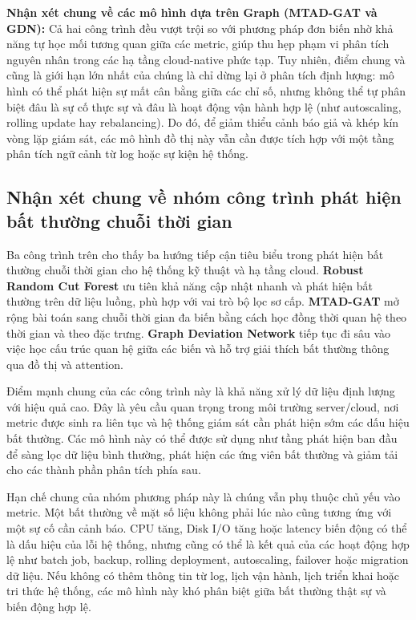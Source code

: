 \textbf{Nhận xét chung về các mô hình dựa trên Graph (MTAD-GAT và GDN):} 
Cả hai công trình đều vượt trội so với phương pháp đơn biến nhờ khả năng tự học mối tương quan giữa các metric, giúp thu hẹp phạm vi phân tích nguyên nhân trong các hạ tầng cloud-native phức tạp. Tuy nhiên, điểm chung và cũng là giới hạn lớn nhất của chúng là chỉ dừng lại ở phân tích định lượng: mô hình có thể phát hiện sự mất cân bằng giữa các chỉ số, nhưng không thể tự phân biệt đâu là sự cố thực sự và đâu là hoạt động vận hành hợp lệ (như autoscaling, rolling update hay rebalancing). Do đó, để giảm thiểu cảnh báo giả và khép kín vòng lặp giám sát, các mô hình đồ thị này vẫn cần được tích hợp với một tầng phân tích ngữ cảnh từ log hoặc sự kiện hệ thống.

\subsection*{Nhận xét chung về nhóm công trình phát hiện bất thường chuỗi thời gian}

Ba công trình trên cho thấy ba hướng tiếp cận tiêu biểu trong phát hiện bất thường chuỗi thời gian cho hệ thống kỹ thuật và hạ tầng cloud.\textbf{ Robust Random Cut Forest} ưu tiên khả năng cập nhật nhanh và phát hiện bất thường trên dữ liệu luồng, phù hợp với vai trò bộ lọc sơ cấp. \textbf{MTAD-GAT} mở rộng bài toán sang chuỗi thời gian đa biến bằng cách học đồng thời quan hệ theo thời gian và theo đặc trưng. \textbf{Graph Deviation Network} tiếp tục đi sâu vào việc học cấu trúc quan hệ giữa các biến và hỗ trợ giải thích bất thường thông qua đồ thị và attention.

Điểm mạnh chung của các công trình này là khả năng xử lý dữ liệu định lượng với hiệu quả cao. Đây là yêu cầu quan trọng trong môi trường server/cloud, nơi metric được sinh ra liên tục và hệ thống giám sát cần phát hiện sớm các dấu hiệu bất thường. Các mô hình này có thể được sử dụng như tầng phát hiện ban đầu để sàng lọc dữ liệu bình thường, phát hiện các ứng viên bất thường và giảm tải cho các thành phần phân tích phía sau.

Hạn chế chung của nhóm phương pháp này là chúng vẫn phụ thuộc chủ yếu vào metric. Một bất thường về mặt số liệu không phải lúc nào cũng tương ứng với một sự cố cần cảnh báo. CPU tăng, Disk I/O tăng hoặc latency biến động có thể là dấu hiệu của lỗi hệ thống, nhưng cũng có thể là kết quả của các hoạt động hợp lệ như batch job, backup, rolling deployment, autoscaling, failover hoặc migration dữ liệu. Nếu không có thêm thông tin từ log, lịch vận hành, lịch triển khai hoặc tri thức hệ thống, các mô hình này khó phân biệt giữa bất thường thật sự và biến động hợp lệ.

